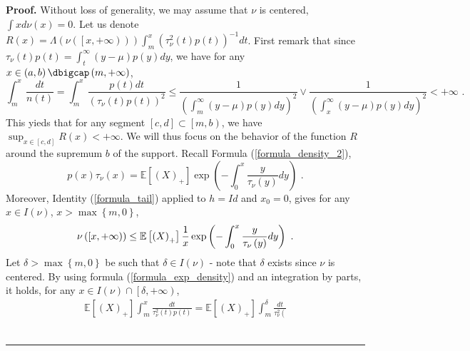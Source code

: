 \documentclass[11pt]{article}
\newenvironment{proof}[1][Proof]{\noindent\textbf{#1.} }{\ \rule{0.5em}{0.5em}}
\begin{document}
\begin{proof}
Without loss of generality, we may assume that $\nu $ is centered, $\int
xd\nu \left( x\right) =0$. Let us denote $R\left( x\right) =\Lambda \left(
\nu \left( \left[ x,+\infty \right) \right) \right) \int_{m}^{x}\left( \tau
_{\nu }^{2}\left( t\right) p\left( t\right) \right) ^{-1}dt$. First remark
that since $\tau _{\nu }\left( t\right) p\left( t\right) =\int_{t}^{\infty
}\left( y-\mu \right) p\left( y\right) dy$, we have for any $x\in \left(
a,b\right) \dbigcap \left( m,+\infty \right) $,%
\begin{equation*}
\int_{m}^{x}\frac{dt}{n\left( t\right) }=\int_{m}^{x}\frac{p\left( t\right)
dt}{\left( \tau _{\nu }\left( t\right) p\left( t\right) \right) ^{2}}\leq 
\frac{1}{\left( \int_{m}^{\infty }\left( y-\mu \right) p\left( y\right)
dy\right) ^{2}}\vee \frac{1}{\left( \int_{x}^{\infty }\left( y-\mu \right)
p\left( y\right) dy\right) ^{2}}<+\infty \text{ .}
\end{equation*}%
This yieds that for any segment $\left[ c,d\right] \subset \left[ m,b\right) 
$, we have $\sup_{x\in \left[ c,d\right] }R\left( x\right) <+\infty $. We
will thus focus on the behavior of the function $R$ around the supremum $b$
of the support. Recall Formula (\ref{formula_density_2}),%
\begin{equation}
p\left( x\right) \tau _{\nu }\left( x\right) =\mathbb{E}\left[ \left(
X\right) _{+}\right] \exp \left( -\int_{0}^{x}\frac{y}{\mathcal{\tau }_{\nu
}\left( y\right) }dy\right) \text{ .}  \label{formula_exp_density}
\end{equation}%
Moreover, Identity (\ref{formula_tail}) applied to $h=Id$ and $x_{0}=0$,
gives for any $x\in I\left( \nu \right) $, $x>\max \left\{ m,0\right\} $,%
\begin{equation*}
\nu \left( \left[ x,+\infty \right) \right) \leq \mathbb{E}\left[ \left(
X\right) _{+}\right] \frac{1}{x}\exp \left( -\int_{0}^{x}\frac{y}{\mathcal{%
\tau }_{\nu }\left( y\right) }dy\right) \text{ .}
\end{equation*}%
Let $\delta >\max \left\{ m,0\right\} $ be such that $\delta \in I\left( \nu
\right) $ - note that $\delta $ exists since $\nu $ is centered. By using
formula (\ref{formula_exp_density}) and an integration by parts, it holds,
for any $x\in I\left( \nu \right) \cap \left[ \delta ,+\infty \right) $,%
\begin{gather}
\mathbb{E}\left[ \left( X\right) _{+}\right] \int_{m}^{x}\frac{dt}{\tau
_{\nu }^{2}\left( t\right) p\left( t\right) }=\mathbb{E}\left[ \left(
X\right) _{+}\right] \int_{m}^{\delta }\frac{dt}{\tau _{\nu }^{2}\left(
}
\end{gather}
\end{proof}
\end{document}
